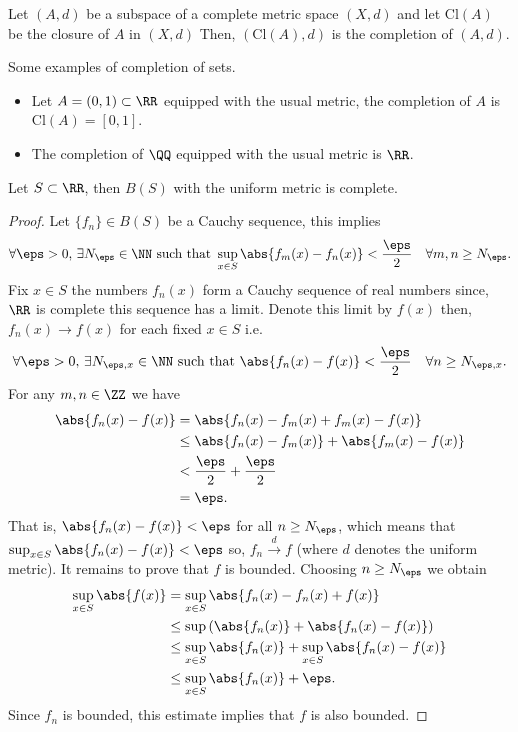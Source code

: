 \documentclass[12pt, a4paper]{article}
\begin{document}
\begin{mdthm}
    Let \((A,d)\) be a subspace of a complete metric space \((X,d)\) and let \(\text{Cl}(A)\) be the closure of \(A\) in \((X,d)\) Then, \((\text{Cl}(A),d)\) is the completion of \((A,d)\).
\end{mdthm}

\begin{mdexample}
    Some examples of completion of sets.
    \begin{itemize}
        \item Let \(A = (0,1)\subset \RR\) equipped with the usual metric, the completion of \(A\) is \(\text{Cl}(A)=[0,1]\).
        \item The completion of \(\QQ\) equipped with the usual metric is \(\RR\).
    \end{itemize}
\end{mdexample}

\begin{theorem}
    Let \(S \subset \RR\), then \(B(S)\) with the uniform metric is complete.
\end{theorem}

\begin{proof}
    Let \(\{f_n\} \in B(S)\) be a Cauchy sequence, this implies 
    \[\forall \eps>0, \, \exists N_{\eps} \in \NN \text{ such that } \sup_{x \in S} \abs{f_m(x)-f_n(x)} <\frac{\eps}{2} \quad \forall m,n \geq N_{\eps}.\]
    Fix \(x \in S\) the numbers \(f_n(x)\) form a Cauchy sequence of real numbers since, \(\RR\) is complete this sequence has a limit. Denote this limit by \(f(x)\) then, \(f_n(x) \to f(x)\) for each fixed \(x\in S\) i.e. 
    \[\forall \eps>0, \, \exists N_{\eps,x} \in \NN \text{ such that } \abs{f_n(x)-f(x)} <\frac{\eps}{2} \quad \forall n \geq N_{\eps,x}.\]
    For any \(m,n \in \ZZ\) we have 
    \[\begin{aligned}
        \abs{f_n(x)-f(x)} &= \abs{f_n(x) -f_m(x)+f_m(x)-f(x)} \\
        &\leq \abs{f_n(x) -f_m(x)} + \abs{f_m(x)-f(x)} \\
        &< \frac{\eps}{2} +\frac{\eps}{2} \\
        &= \eps.
    \end{aligned}\]
    That is, \(\abs{f_n(x)-f(x)} <\eps\) for all \(n \geq N_{\eps}\), which means that \(\sup_{x \in S} \abs{f_n(x)-f(x)}<\eps\) so, \(f_n \xrightarrow{d} f\) (where \(d\) denotes the uniform metric). 
    It remains to prove that \(f\) is bounded. Choosing \(n \geq N_{\eps}\) we obtain 
    \[\begin{aligned}
        \sup_{x\in S} \abs{f(x)} &= \sup_{x\in S} \abs{f_n(x)-f_n(x)+f(x)} \\
        &\leq \sup\left( \abs{f_n(x)} + \abs{f_n(x)-f(x)} \right) \\
        &\leq \sup_{x\in S} \abs{f_n(x)}+\sup_{x\in S}\abs{f_n(x)-f(x)} \\
        &\leq \sup_{x\in S} \abs{f_n(x)} +\eps.
    \end{aligned}\]
    Since \(f_n\) is bounded, this estimate implies that \(f\) is also bounded.
\end{proof}
\end{document}
